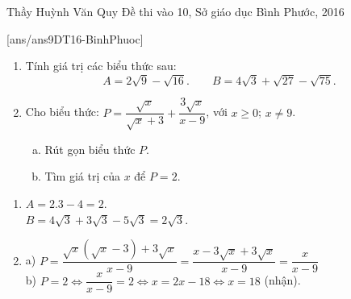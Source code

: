 \begin{name}
{Thầy  Huỳnh Văn Quy}
{Đề thi vào 10, Sở giáo dục Bình Phước, 2016}
\end{name}
\setcounter{ex}{0}
[ans/ans9DT16-BinhPhuoc]
\begin{ex}%
    \hfill
    \begin{enumerate}[1)]
        \item Tính giá trị các biểu thức sau:
        \[A=2\sqrt{9}-\sqrt{16}.\qquad B=4\sqrt{3}+\sqrt{27}-\sqrt{75}.\]
        \item Cho biểu thức: $P=\dfrac{\sqrt{x}}{\sqrt{x}+3}+\dfrac{3\sqrt{x}}{x-9}$, với $x\geq0$; $x\ne9$.
        \begin{enumerate}[a)]
        	\item Rút gọn biểu thức $P$.
        	\item Tìm giá trị của $x$ để $P=2$.
        \end{enumerate}
    \end{enumerate}
\loigiai
    {
    \begin{enumerate}[1)]
        \item $A=2.3-4=2$.\\
        $B=4\sqrt{3}+3\sqrt{3}-5\sqrt{3}=2\sqrt{3}$.
        \item a) $P=\dfrac{\sqrt{x}(\sqrt{x}-3)+3\sqrt{x}}{x-9}=\dfrac{x-3\sqrt{x}+3\sqrt{x}}{x-9}=\dfrac{x}{x-9}$\\
        b) $P=2\Leftrightarrow \dfrac{x}{x-9}=2\Leftrightarrow x=2x-18\Leftrightarrow x=18$ (nhận).
    \end{enumerate}
    }
\end{ex}

